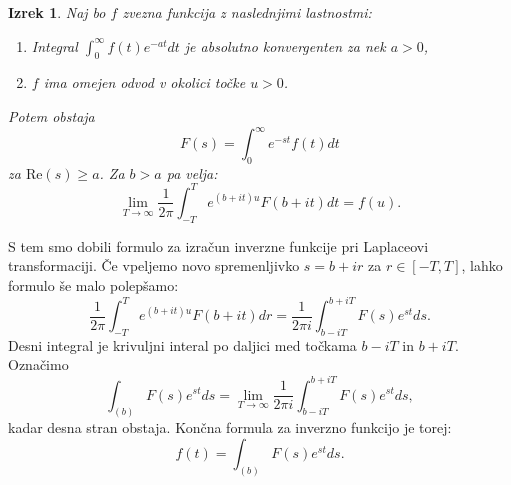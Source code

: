 \documentclass[12pt,a4paper]{amsart}
\theoremstyle{definition} %
\theoremstyle{plain} %
\newtheorem{izrek}[definicija]{Izrek}
\begin{document}
\begin{izrek}
    Naj bo $f$ zvezna funkcija z naslednjimi lastnostmi:
    \begin{enumerate}
        \item[(a)]Integral $\int_0^{\infty}f(t)e^{-at}dt$ je absolutno konvergenten za nek $a>0$,
        \item[(b)]$f$ ima omejen odvod v okolici točke $u>0$.  
    \end{enumerate}
    Potem obstaja
    \[F(s)=\int_0^{\infty}e^{-st}f(t)dt\]
    za $\text{Re}(s)\geq a$. Za $b>a$ pa velja:
    \[\lim_{T\to\infty}\frac{1}{2\pi}\int_{-T}^{T}e^{(b+it)u}F(b+it)dt=f(u).\]
\end{izrek}


S tem smo dobili formulo za izračun inverzne funkcije pri Laplaceovi transformaciji.
Če vpeljemo novo spremenljivko $s=b+ir$ za $r\in[-T,T]$, lahko formulo še malo polepšamo:
\[\frac{1}{2\pi}\int_{-T}^{T}e^{(b+it)u}F(b+it)dr=\frac{1}{2\pi i}\int_{b-iT}^{b+iT}F(s)e^{st}ds.\]
Desni integral je krivuljni interal po daljici med točkama $b-iT$ in $b+iT$. Označimo
\[ \int_{(b)}F(s)e^{st}ds=\lim_{T\to\infty}\frac{1}{2\pi i}\int_{b-iT}^{b+iT}F(s)e^{st}ds,\]
kadar desna stran obstaja.
Končna formula za inverzno funkcijo je torej:
\[f(t)=\int_{(b)}F(s)e^{st}ds.\]
\end{document}
